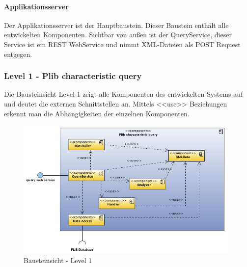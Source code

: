\paragraph{Applikationsserver}

Der Applikationsserver ist der Hauptbaustein. Dieser Baustein enthält alle entwickelten Komponenten. Sichtbar von außen ist der QueryService, dieser Service ist ein REST WebService und nimmt XML-Dateien als POST Request entgegen. 

\subsubsection{Level 1 - Plib characteristic query} 

Die Bausteinsicht Level 1 zeigt alle Komponenten des entwickelten Systems auf und deutet die externen Schnittstellen an. Mittels <<use>> Beziehungen erkennt man die Abhängigkeiten der einzelnen Komponenten. 

\begin{figure}[htbp]
	\centering
		\includegraphics[width=0.98\textwidth]{images/bausteinsicht_plib_level1.png}
	\caption{Bausteinsicht - Level 1}
	\label{fig:bausteinsicht_level1}
\end{figure}

